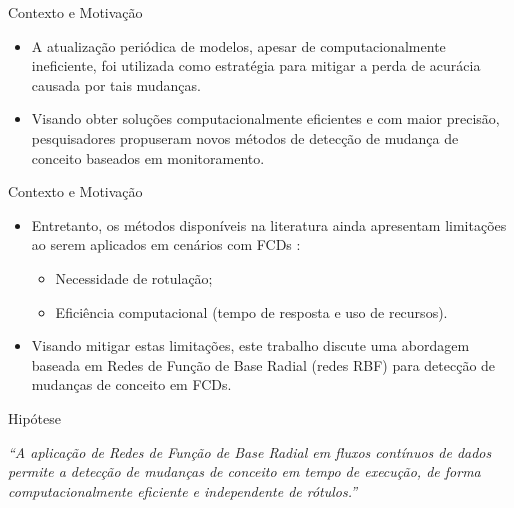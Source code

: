 \documentclass[10pt]{beamer}
\begin{document}
\begin{frame}{Contexto e Motivação}
    \begin{itemize}
        \item<1 -> A atualização periódica de modelos, apesar de computacionalmente ineficiente, foi utilizada como estratégia para mitigar a perda de acurácia causada por tais mudanças.
        \item<2 -> Visando obter soluções computacionalmente eficientes e com maior precisão, pesquisadores propuseram novos métodos de detecção de mudança de conceito baseados em monitoramento.
      \end{itemize}
\end{frame}


\begin{frame}{Contexto e Motivação}
    \begin{itemize}
        \item<1 -> Entretanto, os métodos disponíveis na literatura ainda apresentam limitações ao serem aplicados em cenários com FCDs \cite{Aggarwal:2006:DSM:1196418}:
        \begin{itemize}
            \item<2 -> Necessidade de rotulação;
            \item<2 -> Eficiência computacional (tempo de resposta e uso de recursos).
        \end{itemize}
        \item<3 -> Visando mitigar estas limitações, este trabalho discute uma abordagem baseada em \alert{Redes de Função de Base Radial (redes RBF)} para detecção de mudanças de conceito em FCDs.
      \end{itemize}
\end{frame}


\begin{frame}{Hipótese}

    \begin{center}
        \textit{``A aplicação de Redes de Função de Base Radial em fluxos contínuos de dados permite a detecção de mudanças de conceito em tempo de execução, de forma computacionalmente eficiente e independente de rótulos.''}
    \end{center}

\end{frame}
\end{document}
